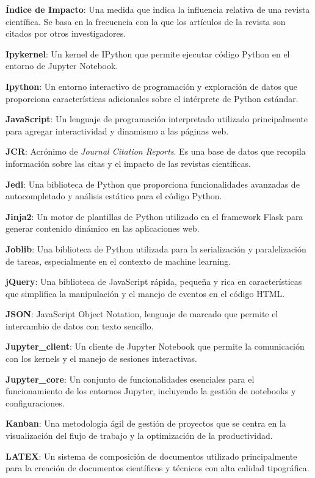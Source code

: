 \textbf{Índice de Impacto}: Una medida que indica la influencia relativa de una revista científica. Se basa en la frecuencia con la que los artículos de la revista son citados por otros investigadores.

\textbf{Ipykernel}: Un kernel de IPython que permite ejecutar código Python en el entorno de Jupyter Notebook.

\textbf{Ipython}: Un entorno interactivo de programación y exploración de datos que proporciona características adicionales sobre el intérprete de Python estándar.

\textbf{JavaScript}: Un lenguaje de programación interpretado utilizado principalmente para agregar interactividad y dinamismo a las páginas web.

\textbf{JCR}: Acrónimo de \textit{Journal Citation Reports}. Es una base de datos que recopila información sobre las citas y el impacto de las revistas científicas.

\textbf{Jedi}: Una biblioteca de Python que proporciona funcionalidades avanzadas de autocompletado y análisis estático para el código Python.

\textbf{Jinja2}: Un motor de plantillas de Python utilizado en el framework Flask para generar contenido dinámico en las aplicaciones web.

\textbf{Joblib}: Una biblioteca de Python utilizada para la serialización y paralelización de tareas, especialmente en el contexto de machine learning.

\textbf{jQuery}: Una biblioteca de JavaScript rápida, pequeña y rica en características que simplifica la manipulación y el manejo de eventos en el código HTML.

\textbf{JSON}: JavaScript Object Notation, lenguaje de marcado que permite el intercambio de datos con texto sencillo.

\textbf{Jupyter\_client}: Un cliente de Jupyter Notebook que permite la comunicación con los kernels y el manejo de sesiones interactivas.

\textbf{Jupyter\_core}: Un conjunto de funcionalidades esenciales para el funcionamiento de los entornos Jupyter, incluyendo la gestión de notebooks y configuraciones.

\textbf{Kanban}: Una metodología ágil de gestión de proyectos que se centra en la visualización del flujo de trabajo y la optimización de la productividad.

\textbf{LATEX}: Un sistema de composición de documentos utilizado principalmente para la creación de documentos científicos y técnicos con alta calidad tipográfica.

